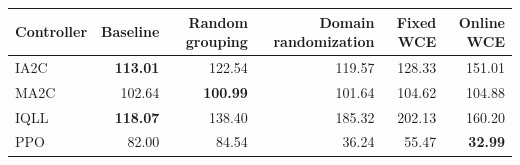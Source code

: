 \begin{tabular}{lrrrrr}
\hline
Controller & Baseline & Random grouping & Domain randomization & Fixed WCE & Online WCE \\
\hline
IA2C & \textbf{113.01} & 122.54 & 119.57 & 128.33 & 151.01 \\
MA2C & 102.64 & \textbf{100.99} & 101.64 & 104.62 & 104.88 \\
IQLL & \textbf{118.07} & 138.40 & 185.32 & 202.13 & 160.20 \\
PPO & 82.00 & 84.54 & 36.24 & 55.47 & \textbf{32.99} \\
\hline
\end{tabular}
